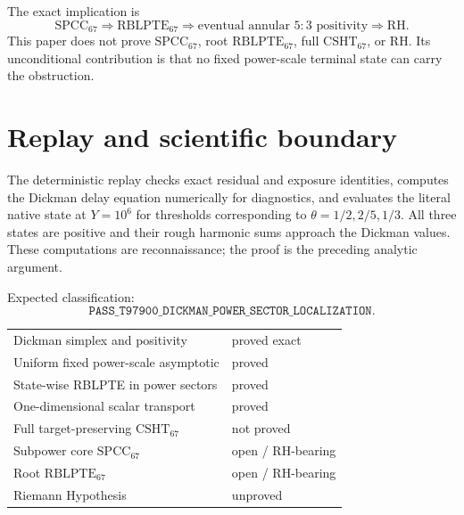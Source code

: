 \documentclass[11pt]{article}
\newcommand{\CSHT}{\mathrm{CSHT}_{67}}
\newcommand{\RBLPTE}{\mathrm{RBLPTE}_{67}}
\newcommand{\SPCC}{\mathrm{SPCC}_{67}}
\begin{document}
The exact implication is
\[
 \SPCC\Longrightarrow\RBLPTE
 \Longrightarrow\text{eventual annular }5{:}3\text{ positivity}
 \Longrightarrow\mathrm{RH}.
\]
This paper does not prove $\SPCC$, root $\RBLPTE$, full $\CSHT$, or RH.  Its
unconditional contribution is that no fixed power-scale terminal state can
carry the obstruction.

\section{Replay and scientific boundary}

The deterministic replay checks exact residual and exposure identities,
computes the Dickman delay equation numerically for diagnostics, and evaluates
the literal native state at $Y=10^6$ for thresholds corresponding to
$\theta=1/2,2/5,1/3$.  All three states are positive and their rough harmonic
sums approach the Dickman values.  These computations are reconnaissance; the
proof is the preceding analytic argument.

Expected classification:
\[
 \texttt{PASS\_T97900\_DICKMAN\_POWER\_SECTOR\_LOCALIZATION}.
\]

\begin{center}
\begin{tabular}{ll}
\toprule
Dickman simplex and positivity & proved exact\\
Uniform fixed power-scale asymptotic & proved\\
State-wise RBLPTE in power sectors & proved\\
One-dimensional scalar transport & proved\\
Full target-preserving $\CSHT$ & not proved\\
Subpower core $\SPCC$ & open / RH-bearing\\
Root $\RBLPTE$ & open / RH-bearing\\
Riemann Hypothesis & unproved\\
\bottomrule
\end{tabular}
\end{center}
\end{document}
